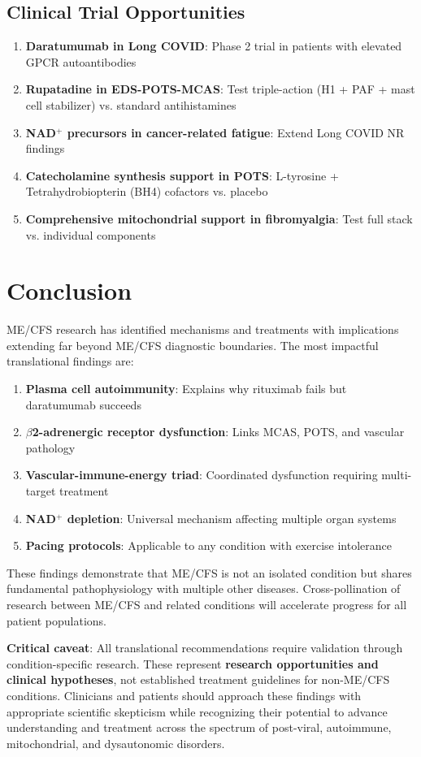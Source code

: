 \subsection{Clinical Trial Opportunities}

\begin{enumerate}
    \item \textbf{Daratumumab in Long COVID}: Phase 2 trial in patients with elevated GPCR autoantibodies
    \item \textbf{Rupatadine in EDS-POTS-MCAS}: Test triple-action (H1 + PAF + mast cell stabilizer) vs. standard antihistamines
    \item \textbf{NAD$^+$ precursors in cancer-related fatigue}: Extend Long COVID NR findings
    \item \textbf{Catecholamine synthesis support in POTS}: L-tyrosine + Tetrahydrobiopterin (BH4) cofactors vs. placebo
    \item \textbf{Comprehensive mitochondrial support in fibromyalgia}: Test full stack vs. individual components
\end{enumerate}

\section{Conclusion}
\label{sec:translational-conclusion}

ME/CFS research has identified mechanisms and treatments with implications extending far beyond ME/CFS diagnostic boundaries. The most impactful translational findings are:

\begin{enumerate}
    \item \textbf{Plasma cell autoimmunity}: Explains why rituximab fails but daratumumab succeeds
    \item \textbf{$\beta$2-adrenergic receptor dysfunction}: Links MCAS, POTS, and vascular pathology
    \item \textbf{Vascular-immune-energy triad}: Coordinated dysfunction requiring multi-target treatment
    \item \textbf{NAD$^+$ depletion}: Universal mechanism affecting multiple organ systems
    \item \textbf{Pacing protocols}: Applicable to any condition with exercise intolerance
\end{enumerate}

These findings demonstrate that ME/CFS is not an isolated condition but shares fundamental pathophysiology with multiple other diseases. Cross-pollination of research between ME/CFS and related conditions will accelerate progress for all patient populations.

\textbf{Critical caveat}: All translational recommendations require validation through condition-specific research. These represent \textbf{research opportunities and clinical hypotheses}, not established treatment guidelines for non-ME/CFS conditions. Clinicians and patients should approach these findings with appropriate scientific skepticism while recognizing their potential to advance understanding and treatment across the spectrum of post-viral, autoimmune, mitochondrial, and dysautonomic disorders.

